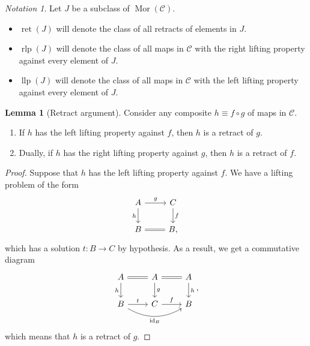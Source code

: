 \documentclass[10pt,letterpaper,cm]{nupset}
\theoremstyle{definition}
\theoremstyle{theorem}
\newtheorem{lemma}[definition]{Lemma}
\theoremstyle{remark}
\newtheorem*{notation}{Notation}
\DeclareMathOperator{\mor}{Mor}
\newcommand{\0}{\mathbf{0}}
\newcommand{\1}{\mathbf{1}}
\newcommand{\2}{\mathbf{2}}
\renewcommand{\c}{\mathscr{C}}
\DeclareMathOperator{\idd}{id}
\DeclareMathOperator{\ret}{ret}
\DeclareMathOperator{\rlp}{rlp}
\DeclareMathOperator{\llp}{llp}
\newcommand{\bi}{\begin{itemize}}
\newcommand{\ei}{\end{itemize}}
\newcommand{\be}{\begin{enumerate}}
\newcommand{\ee}{\end{enumerate}}
\begin{document}
\begin{notation} Let $J$ be a subclass of $\mor(\c)$.
\bi
\item $\ret(J)$ will denote the class of all retracts of elements in $J$.
\item $\rlp(J)$ will denote the class of all maps in $\c$ with the right lifting property against every element of $J$.
\item $\llp(J)$ will denote the class of all maps in $\c$ with the left lifting property against every element of $J$.
\ei
\end{notation}

\smallskip

\begin{lemma}[Retract argument]\label{RA}
Consider any composite $h \equiv f \circ g$ of maps in $\c$.
\be[label=(\alph*)]
\item If $h$ has the left lifting property against $f$, then $h$ is a retract of $g$.
\item Dually, if $h$ has the right lifting property against $g$, then $h$ is a retract of $f$.
\ee
\end{lemma}
\begin{proof}
Suppose that $h$ has the left lifting property against $f$. We have a lifting problem of the form
\[
\begin{tikzcd}
A \arrow[d, "h"'] \arrow[r, "g"] & C \arrow[d, "f"] \\
B \arrow[r, equals]                      & B               
,\end{tikzcd}
\] which has a solution $t: B \to C$ by hypothesis.  As a result, we get a commutative diagram
\[
\begin{tikzcd}
A \arrow[r, equals] \arrow[d, "h"']                        & A \arrow[r, equals] \arrow[d, "g"] & A \arrow[d, "h"] \\
B \arrow[r, "t"] \arrow[rr, "\idd_B"', bend right] & C \arrow[r, "f"]           & B               
\end{tikzcd}
,\] which means that $h$ is a retract of $g$. 
\end{proof}
\end{document}
